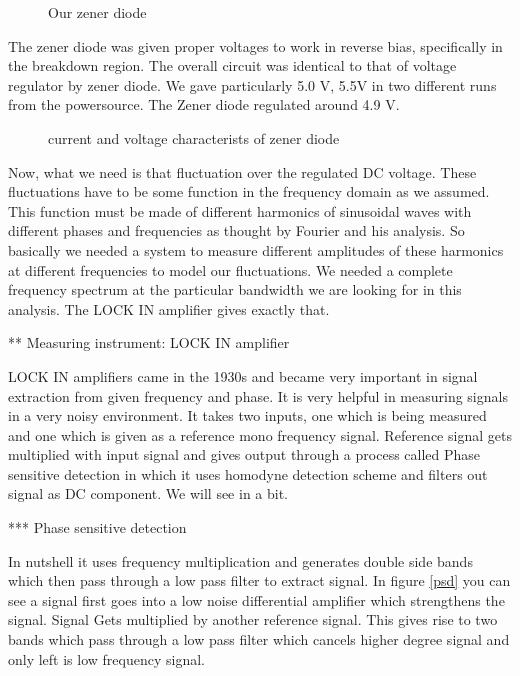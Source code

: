 \documentclass[final,5p,12pt,twocolumn]{elsaarticle}
\begin{document}
\begin{figure}[hbt!]
\caption{Our zener diode}
\end{figure}

The zener diode was given proper voltages to work in reverse bias, specifically in the breakdown region. The overall circuit was identical to that of voltage regulator by zener diode. We gave particularly 5.0 V, 5.5V in two different runs from the powersource. The Zener diode regulated around 4.9 V. 

\begin{figure}[hbt!]
\caption{current and voltage characterists of zener diode \label{exiv}}
\end{figure}

Now, what we need is that fluctuation over the regulated DC voltage. These fluctuations have to be some function in the frequency domain as we assumed. This function must be made of different harmonics of sinusoidal waves with different phases and frequencies as thought by Fourier and his analysis. So basically we needed a system to measure different amplitudes of these harmonics at different frequencies to model our fluctuations. We needed a complete frequency spectrum at the particular bandwidth we are looking for in this analysis. The LOCK IN amplifier gives exactly that. 


** Measuring instrument: LOCK IN amplifier 

LOCK IN amplifiers came in the 1930s and became very important in signal extraction from given frequency and phase. It is very helpful in measuring signals in a very noisy environment. It takes two inputs, one which is being measured and one which is given as a reference mono frequency signal. Reference signal gets multiplied with input signal and gives output through a process called Phase sensitive detection in which it uses homodyne detection scheme and filters out signal as DC component. We will see in a bit.

*** Phase sensitive detection

In nutshell it uses frequency multiplication and generates double side bands which then pass through a low pass filter to extract signal. In figure \ref{psd} you can see a signal first goes into a low noise differential amplifier which strengthens the signal. Signal Gets multiplied by another reference signal. This gives rise to two bands which pass through a low pass filter which cancels higher degree signal and only left is low frequency signal. 
\end{document}
